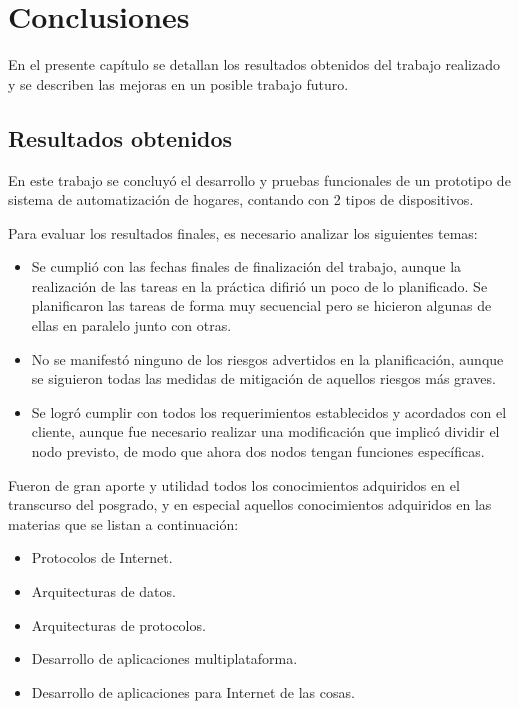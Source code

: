 \chapter{Conclusiones}

\label{Chapter5}

En el presente capítulo se detallan los resultados obtenidos del trabajo realizado y se describen las mejoras en un posible trabajo futuro.

\section{Resultados obtenidos}

En este trabajo se concluyó el desarrollo y pruebas funcionales de un prototipo de sistema de automatización de hogares, contando con 2 tipos de dispositivos.

Para evaluar los resultados finales, es necesario analizar los siguientes temas:

\begin{itemize}
	\item Se cumplió con las fechas finales de finalización del trabajo, aunque la realización de las tareas en la práctica difirió un poco de lo planificado. Se planificaron las tareas de forma muy secuencial pero se hicieron algunas de ellas en paralelo junto con otras.
	\item No se manifestó ninguno de los riesgos advertidos en la planificación, aunque se siguieron todas las medidas de mitigación de aquellos riesgos más graves.
	\item Se logró cumplir con todos los requerimientos establecidos y acordados con el cliente, aunque fue necesario realizar una modificación que implicó dividir el nodo previsto, de modo que ahora dos nodos tengan funciones específicas.
\end{itemize}

Fueron de gran aporte y utilidad todos los conocimientos adquiridos en el transcurso del posgrado, y en especial aquellos conocimientos adquiridos en las materias que se listan a continuación:

\begin{itemize}
	\item Protocolos de Internet.
	\item Arquitecturas de datos.
	\item Arquitecturas de protocolos.
	\item Desarrollo de aplicaciones multiplataforma.
	\item Desarrollo de aplicaciones para Internet de las cosas.
\end{itemize}

